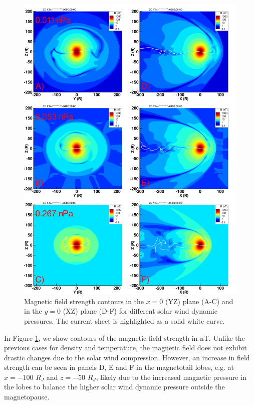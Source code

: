 \begin{figure}
    \centering
    \includegraphics[height=0.9\textheight]{images5/compare_runs_currentsheet_Bmag.png}
    \caption{Magnetic field strength contours in the $x=0$ (YZ) plane (A-C) and in the $y=0$ (XZ) plane (D-F) for different solar wind dynamic pressures. The current sheet is highlighted as a solid white curve.}
    \label{fig:chp5-comparison-slices-Bmag}
\end{figure}

In Figure \ref{fig:chp5-comparison-slices-Bmag}, we show contours of the magnetic field strength in nT. Unlike the previous cases for density and temperature, the magnetic field does not exhibit drastic changes due to the solar wind compression. However, an increase in field strength can be seen in panels D, E and F in the magnetotail lobes, e.g. at $x=-100$ $R_J$ and $z=-50$ $R_J$, likely due to the increased magnetic pressure in the lobes to balance the higher solar wind dynamic pressure outside the magnetopause. 

